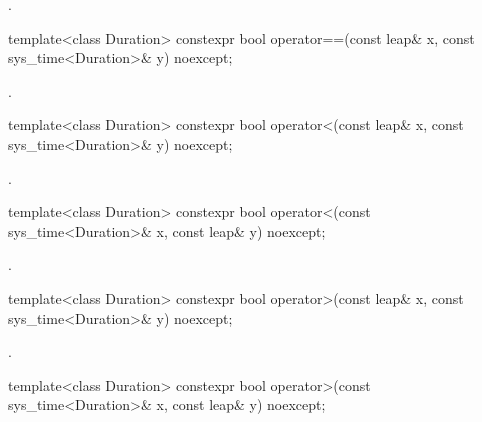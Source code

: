 \begin{itemdescr}
\pnum
\returns
{}.
\end{itemdescr}

%
%
\begin{itemdecl}
template<class Duration>
  constexpr bool operator==(const leap& x, const sys_time<Duration>& y) noexcept;
\end{itemdecl}

\begin{itemdescr}
\pnum
\returns
{}.
\end{itemdescr}

%
%
\begin{itemdecl}
template<class Duration>
  constexpr bool operator<(const leap& x, const sys_time<Duration>& y) noexcept;
\end{itemdecl}

\begin{itemdescr}
\pnum
\returns
{}.
\end{itemdescr}

%
%
\begin{itemdecl}
template<class Duration>
  constexpr bool operator<(const sys_time<Duration>& x, const leap& y) noexcept;
\end{itemdecl}

\begin{itemdescr}
\pnum
\returns
{}.
\end{itemdescr}

%
%
\begin{itemdecl}
template<class Duration>
  constexpr bool operator>(const leap& x, const sys_time<Duration>& y) noexcept;
\end{itemdecl}

\begin{itemdescr}
\pnum
\returns
{}.
\end{itemdescr}

%
%
\begin{itemdecl}
template<class Duration>
  constexpr bool operator>(const sys_time<Duration>& x, const leap& y) noexcept;
\end{itemdecl}


